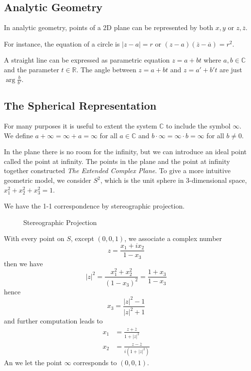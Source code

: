 \documentclass[../main.tex]{subfiles}
\begin{document}
\subsection{Analytic Geometry}
In analytic geometry, points of a 2D plane can be represented by both $x,y$ or $z,\overline{z}$. 

For instance, the equation of a circle is $\left|z-a\right|=r$ or $(z-a)(\overline{z}-\overline{a}) = r^2$.

A straight line can be expressed as parametric equation $z = a+bt$ where $a,b\in \mathbb{C}$ and the parameter $t\in \mathbb{R}$. The angle between $z=a+bt$ and $z=a'+b't$ are just $\arg \frac{b}{b'}$.

\subsection{The Spherical Representation}
For many purposes it is useful to extent the system $\mathbb{C}$ to include the symbol $\infty $. We define $a+ \infty =\infty +a = \infty $ for all $a\in \mathbb{C}$ and $b\cdot \infty =\infty \cdot b=\infty $ for all $b\neq 0$.

In the plane there is no room for the infinity, but we can introduce an ideal point called the point at infinity. The points in the plane and the point at infinity together constructed \emph{The Extended Complex Plane}. To give a more intuitive geometric model, we consider $S^2$, which is the unit sphere in 3-dimensional space, $x_1^2+x_2^2+x_3^2=1$.

We have the 1-1 correspondence by stereographic projection.

\begin{figure}[H]
    \centering
    \caption{Stereographic Projection}
    \label{fig:stereographic-projection}
\end{figure}

With every point on $S$, except $(0,0,1)$, we associate a complex number
\begin{equation*}
z = \frac{x_1+ix_2}{1-x_3}
\end{equation*}
then we have
\begin{equation*}
\left|z\right|^2 = \frac{x_1^2+x_2^2}{(1-x_3)^2} = \frac{1+x_3}{1-x_3}
\end{equation*}
hence
\begin{equation*}
x_3 = \frac{\left|z\right|^2-1}{\left|z\right|^2+1}
\end{equation*}
and further computation leads to 
\begin{equation*}
\begin{aligned}
	x_1 &= \frac{z+\overline{z}}{1+\left|z\right|^2}\\
	x_2 &= \frac{z-\overline{z}}{i(1+\left|z\right|^2)}
\end{aligned}
\end{equation*}
An we let the point $\infty $ corresponds to $(0,0,1)$.
\end{document}
